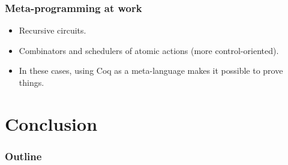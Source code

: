 \documentclass[9pt]{beamer}
\begin{document}
\begin{frame}[fragile]
  \frametitle{Meta-programming at work}

  \begin{itemize}
  \item Recursive circuits. 
  \item \alert{Combinators and schedulers} of atomic actions (more
    control-oriented).
  \item In these cases, using Coq as a meta-language makes it possible
    to prove things. 
  \end{itemize}
\end{frame}


\section{Conclusion}
\begin{frame}
  \frametitle{Outline}       
  \tableofcontents [currentsection] 
\end{frame}
\end{document}
